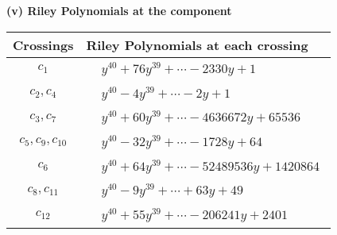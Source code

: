 \documentclass[1p]{elsarticle_modified}
\theoremstyle{definition}
\begin{document}
\flushleft \textbf{(v) Riley Polynomials at the component}\newline \\
\begin{tabular}{m{50pt}|m{274pt}}
Crossings & \hspace{64pt}Riley Polynomials at each crossing \\
\hline $$\begin{aligned}c_{1}\end{aligned}$$&$\begin{aligned}
&y^{40}+76 y^{39}+\cdots-2330 y+1
\end{aligned}$\\
\hline $$\begin{aligned}c_{2},c_{4}\end{aligned}$$&$\begin{aligned}
&y^{40}-4 y^{39}+\cdots-2 y+1
\end{aligned}$\\
\hline $$\begin{aligned}c_{3},c_{7}\end{aligned}$$&$\begin{aligned}
&y^{40}+60 y^{39}+\cdots-4636672 y+65536
\end{aligned}$\\
\hline $$\begin{aligned}c_{5},c_{9},c_{10}\end{aligned}$$&$\begin{aligned}
&y^{40}-32 y^{39}+\cdots-1728 y+64
\end{aligned}$\\
\hline $$\begin{aligned}c_{6}\end{aligned}$$&$\begin{aligned}
&y^{40}+64 y^{39}+\cdots-52489536 y+1420864
\end{aligned}$\\
\hline $$\begin{aligned}c_{8},c_{11}\end{aligned}$$&$\begin{aligned}
&y^{40}-9 y^{39}+\cdots+63 y+49
\end{aligned}$\\
\hline $$\begin{aligned}c_{12}\end{aligned}$$&$\begin{aligned}
&y^{40}+55 y^{39}+\cdots-206241 y+2401
\end{aligned}$\\
\hline
\end{tabular}\\~\\
\end{document}
